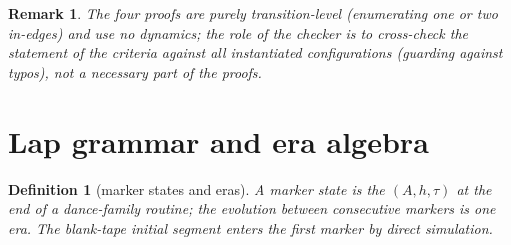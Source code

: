 \documentclass[11pt]{amsart}
\newtheorem{definition}[theorem]{Definition}
\newtheorem{remark}[theorem]{Remark}
\begin{document}
\begin{remark}
The four proofs are purely transition-level (enumerating one or two in-edges) and use no dynamics; the role of the checker is to cross-check the statement of the criteria against all instantiated configurations (guarding against typos), not a necessary part of the proofs.
\end{remark}

\section{Lap grammar and era algebra}

\begin{definition}[marker states and eras]
A marker state is the $(A,h,\tau)$ at the end of a dance-family routine; the evolution between consecutive markers is one era. The blank-tape initial segment enters the first marker by direct simulation.
\end{definition}
\end{document}
